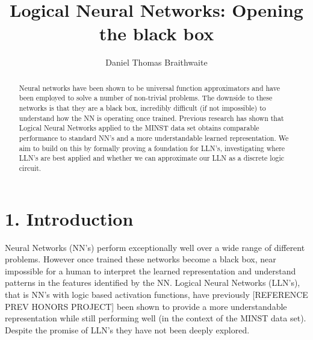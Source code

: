 \documentclass[11pt, a4paper, twoside, openright]{report}
\title{Logical Neural Networks: Opening the black box}
\author{Daniel Thomas Braithwaite}
\date{}
\begin{document}
\frontmatter


\begin{abstract}
Neural networks have been shown to be universal function approximators and have been employed to solve a number of non-trivial problems. The downside to these networks is that they are a black box, incredibly difficult (if not impossible) to understand how the NN is operating once trained. Previous research has shown that Logical Neural Networks applied to the MINST data set obtains comparable performance to standard NN's and a more understandable learned representation. We aim to build on this by formally proving a foundation for LLN's, investigating where LLN's are best applied and whether we can approximate our LLN as a discrete logic circuit.
\end{abstract}


\maketitle




\mainmatter


\section*{1. Introduction}

Neural Networks (NN's) perform exceptionally well over a wide range of different problems. However once trained these networks become a black box, near impossible for a human to interpret the learned representation and understand patterns in the features identified by the NN. Logical Neural Networks (LLN's), that is NN's with logic based activation functions, have previously [REFERENCE PREV HONORS PROJECT] been shown to provide a more understandable representation while still performing well (in the context of the MINST data set). Despite the promise of LLN's they have not been deeply explored.
\end{document}
